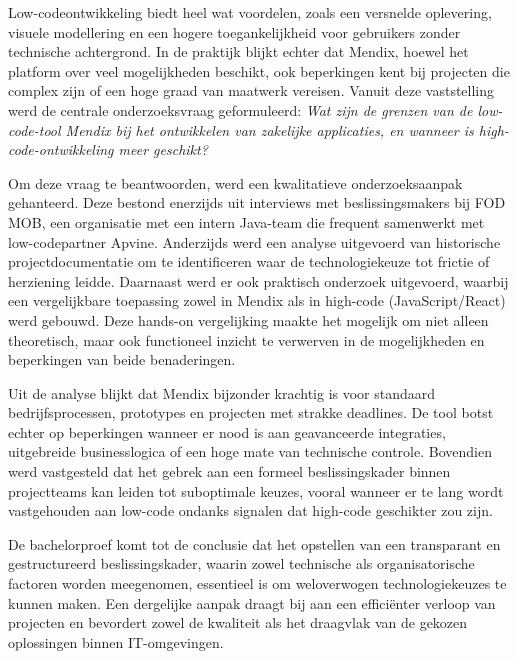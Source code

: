 Low-codeontwikkeling biedt heel wat voordelen, zoals een versnelde oplevering, visuele modellering en een hogere toegankelijkheid voor gebruikers zonder technische achtergrond. In de praktijk blijkt echter dat Mendix, hoewel het platform over veel mogelijkheden beschikt, ook beperkingen kent bij projecten die complex zijn of een hoge graad van maatwerk vereisen. Vanuit deze vaststelling werd de centrale onderzoeksvraag geformuleerd: \textit{Wat zijn de grenzen van de low-code-tool Mendix bij het ontwikkelen van zakelijke applicaties, en wanneer is high-code-ontwikkeling meer geschikt?}

Om deze vraag te beantwoorden, werd een kwalitatieve onderzoeksaanpak gehanteerd. Deze bestond enerzijds uit interviews met beslissingsmakers bij \gls{FOD MOB}, een organisatie met een intern Java-team die frequent samenwerkt met low-codepartner Apvine. Anderzijds werd een analyse uitgevoerd van historische projectdocumentatie om te identificeren waar de technologiekeuze tot frictie of herziening leidde. Daarnaast werd er ook praktisch onderzoek uitgevoerd, waarbij een vergelijkbare toepassing zowel in Mendix als in high-code (JavaScript/React) werd gebouwd. Deze hands-on vergelijking maakte het mogelijk om niet alleen theoretisch, maar ook functioneel inzicht te verwerven in de mogelijkheden en beperkingen van beide benaderingen.

Uit de analyse blijkt dat Mendix bijzonder krachtig is voor standaard bedrijfsprocessen, prototypes en projecten met strakke deadlines. De tool botst echter op beperkingen wanneer er nood is aan geavanceerde integraties, uitgebreide businesslogica of een hoge mate van technische controle. Bovendien werd vastgesteld dat het gebrek aan een formeel beslissingskader binnen projectteams kan leiden tot suboptimale keuzes, vooral wanneer er te lang wordt vastgehouden aan low-code ondanks signalen dat high-code geschikter zou zijn.

De bachelorproef komt tot de conclusie dat het opstellen van een transparant en gestructureerd beslissingskader, waarin zowel technische als organisatorische factoren worden meegenomen, essentieel is om weloverwogen technologiekeuzes te kunnen maken. Een dergelijke aanpak draagt bij aan een efficiënter verloop van projecten en bevordert zowel de kwaliteit als het draagvlak van de gekozen oplossingen binnen IT-omgevingen.



